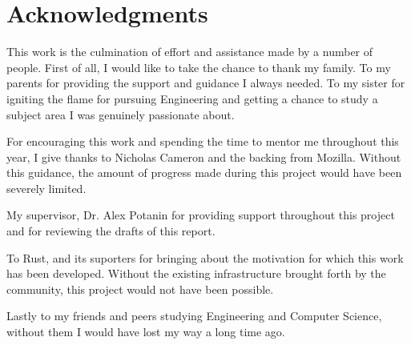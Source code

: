 \chapter*{Acknowledgments}\label{C:ack} 

This work is the culmination of effort and assistance made by a number of people. First of all, I would like to take the chance to thank my family. To my parents for providing the support and guidance I always needed. To my sister for igniting the flame for pursuing Engineering and getting a chance to study a subject area I was genuinely passionate about.

For encouraging this work and spending the time to mentor me throughout this year, I give thanks to Nicholas Cameron and the backing from Mozilla. Without this guidance, the amount of progress made during this project would have been severely limited.

My supervisor, Dr. Alex Potanin for providing support throughout this project and for reviewing the drafts of this report.

To Rust, and its suporters for bringing about the motivation for which this work has been developed. Without the existing infrastructure brought forth by the community, this project would not have been possible.

Lastly to my friends and peers studying Engineering and Computer Science, without them I would have lost my way a long time ago.